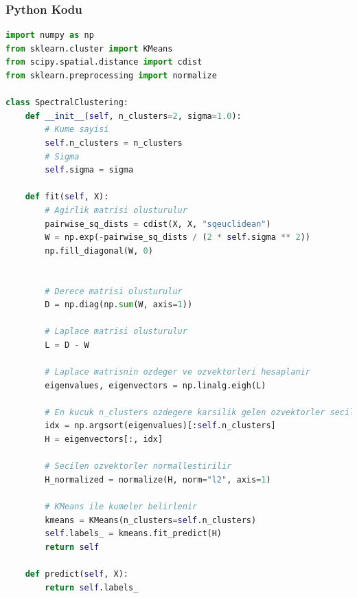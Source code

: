 \newpage

\subsubsection{Python Kodu}

\begin{lstlisting}[language=Python, caption=Scikit-learn'de SpectralClustering örneği.]
import numpy as np
from sklearn.cluster import KMeans
from scipy.spatial.distance import cdist
from sklearn.preprocessing import normalize

class SpectralClustering:
    def __init__(self, n_clusters=2, sigma=1.0):
        # Kume sayisi
        self.n_clusters = n_clusters
        # Sigma
        self.sigma = sigma

    def fit(self, X):
        # Agirlik matrisi olusturulur
        pairwise_sq_dists = cdist(X, X, "sqeuclidean")
        W = np.exp(-pairwise_sq_dists / (2 * self.sigma ** 2))
        np.fill_diagonal(W, 0)


        # Derece matrisi olusturulur
        D = np.diag(np.sum(W, axis=1))

        # Laplace matrisi olusturulur
        L = D - W

        # Laplace matrisnin ozdeger ve ozvektorleri hesaplanir
        eigenvalues, eigenvectors = np.linalg.eigh(L)

        # En kucuk n_clusters ozdegere karsilik gelen ozvektorler secilir
        idx = np.argsort(eigenvalues)[:self.n_clusters]
        H = eigenvectors[:, idx]

        # Secilen ozvektorler normallestirilir
        H_normalized = normalize(H, norm="l2", axis=1)

        # KMeans ile kumeler belirlenir
        kmeans = KMeans(n_clusters=self.n_clusters)
        self.labels_ = kmeans.fit_predict(H)
        return self

    def predict(self, X):
        return self.labels_
\end{lstlisting}

\newpage